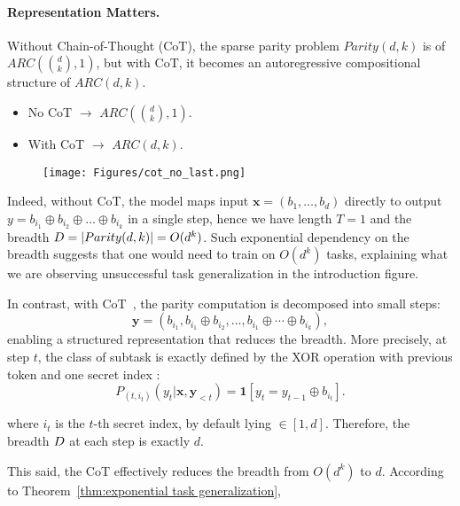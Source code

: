 \paragraph{Representation Matters.}  

Without Chain-of-Thought (CoT), the sparse parity problem \( Parity(d, k) \) is of $ARC(\binom{d}{k}, 1)$, but with CoT, it becomes an autoregressive compositional structure of $ARC(d,k)$. 

\begin{itemize}
    \item No CoT $\rightarrow$ $ARC\left(\binom{d}{k}, 1\right)$.
    \item With CoT $\rightarrow$ $ARC(d, k)$.
\end{itemize}

\begin{figure}[t] 
    \centering
    \texttt{[image: Figures/cot\_no\_last.png]}
    \label{fig:cot}
\end{figure}

Indeed, without CoT, the model maps input \( \bm x = (b_1, \dots, b_d) \) directly to output \( y = b_{i_1} \oplus b_{i_2} \oplus \dots \oplus b_{i_k} \) in a single step, hence we have length $T =1$ and the breadth $D = |Parity(d,k)| = O(d^k)$. Such exponential dependency on the breadth suggests that one would need to train on $O(d^k)$ tasks, explaining what we are observing unsuccessful task generalization in the introduction figure.

In contrast, with CoT~\citep{abbe2024far, wen2024sparse}, the parity computation is decomposed into small steps:  
\[
\bm y = (b_{i_1}, b_{i_1} \oplus b_{i_2}, \dots, b_{i_1} \oplus \cdots \oplus b_{i_k}),
\]
enabling a structured representation that reduces the breadth. More precisely, at step $t$, the class of subtask is exactly defined by the XOR operation with previous token and one secret index : 
\[
P_{(t,i_t)}(y_t|\bm x,\bm y_{<t}) =  \mathbf 1 [y_t=  y_{t-1} \oplus b_{i_t}].
\]

where $i_t$ is the $t$-th secret index, by default lying  $\in [1,d]$. Therefore, the breadth $D$ at each step is exactly $d$.


This said, the CoT effectively reduces the breadth from $O(d^k)$ to $d$. According to Theorem~\ref{thm:exponential task generalization}, 




